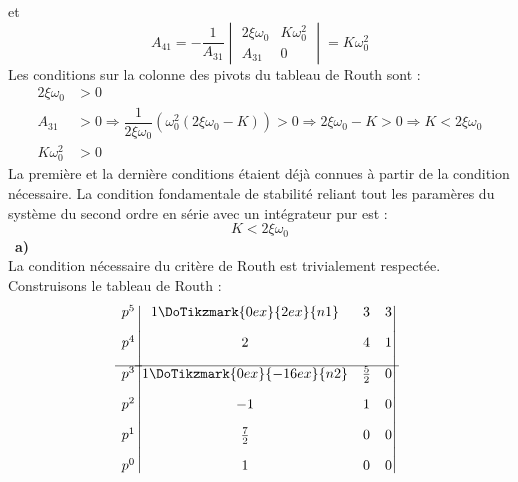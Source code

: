 et
\[
A_{41}=-\dfrac{1}{A_{31}}
       \begin{vmatrix}
       2\xi\omega_0 & K\omega_0^2 \\
       A_{31} & 0
       \end{vmatrix}
      =K\omega_0^2
\]
Les conditions sur la colonne des pivots du tableau de Routh sont :
\begin{align*}
    2\xi\omega_0 &> 0 \\
    A_{31} &> 0 \Rightarrow \dfrac{1}{2\xi\omega_0}
    \left(\omega_0^2(2\xi\omega_0-K)\right) > 0 \Rightarrow 2\xi\omega_0-K > 0 
    \Rightarrow K < 2\xi\omega_0\\
    K\omega_0^2 &> 0 
\end{align*}
La première et la dernière conditions étaient déjà connues à partir de la 
condition nécessaire. La condition fondamentale de stabilité reliant tout 
les paramères du système du second ordre 
en série avec un intégrateur pur est :
\[
K < 2\xi\omega_0
\]
\noindent~\textbf{a)}\\
La condition nécessaire du critère de Routh est trivialement respectée.
Construisons le tableau de Routh :
\[
\begin{matrix}
    p^5 \\[1em]
    p^4 \\[1em]
    \hline
    p^3 \\[1em]
    p^2 \\[1em]
    p^1 \\[1em]
    p^0 
\end{matrix}
\begin{vmatrix}
    1\DoTikzmark{0ex}{2ex}{n1}      & 3   & 3 \\[1em]
    2      & 4   & 1 \\[1em]
    \hline
    1\DoTikzmark{0ex}{-16ex}{n2}   & \frac{5}{2} & 0 \\[1em]
    -1                            & 1  & 0 \\[1em]
    \frac{7}{2}  & 0  &  0 \\[1em]
    1            & 0  &  0 
\end{vmatrix}
\]
